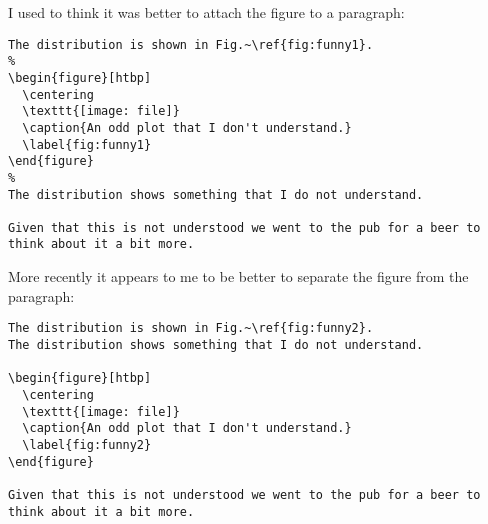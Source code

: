 I used to think it was better to attach the figure to a paragraph:
\begin{verbatim}
The distribution is shown in Fig.~\ref{fig:funny1}.
%
\begin{figure}[htbp]
  \centering
  \texttt{[image: file]}
  \caption{An odd plot that I don't understand.}
  \label{fig:funny1}
\end{figure}
%
The distribution shows something that I do not understand.

Given that this is not understood we went to the pub for a beer to
think about it a bit more.
\end{verbatim}

More recently it appears to me to be better to separate the figure
from the paragraph:
\begin{verbatim}
The distribution is shown in Fig.~\ref{fig:funny2}.
The distribution shows something that I do not understand.

\begin{figure}[htbp]
  \centering
  \texttt{[image: file]}
  \caption{An odd plot that I don't understand.}
  \label{fig:funny2}
\end{figure}

Given that this is not understood we went to the pub for a beer to
think about it a bit more.
\end{verbatim}

